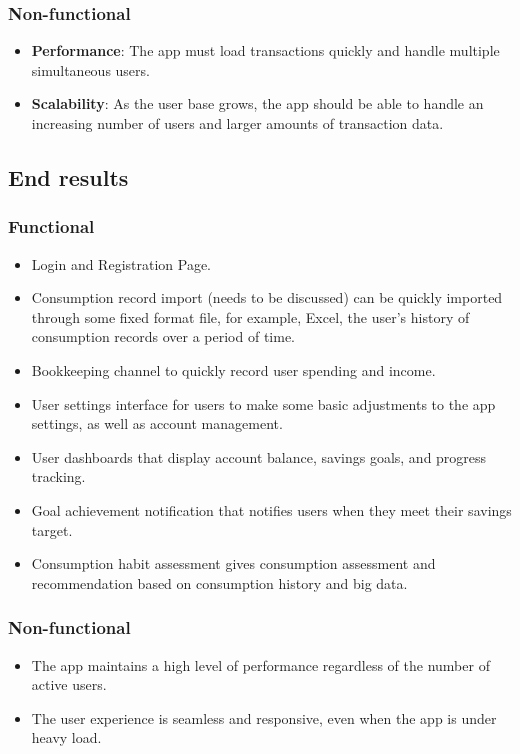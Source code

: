 \documentclass{article}
\begin{document}
\subsubsection{Non-functional}
\begin{itemize}
    \item \textbf{Performance}: The app must load transactions quickly and handle multiple simultaneous users.
    \item \textbf{Scalability}: As the user base grows, the app should be able to handle an increasing number of users and larger amounts of transaction data.
\end{itemize}
\subsection{End results}
\subsubsection{Functional}
\begin{itemize}
    \item Login and Registration Page.
    \item Consumption record import (needs to be discussed) can be quickly imported through some fixed format file, for example, Excel, the user’s history of consumption records over a period of time.
    \item Bookkeeping channel to quickly record user spending and income.
    \item User settings interface for users to make some basic adjustments to the app settings, as well as account management.
    \item User dashboards that display account balance, savings goals, and progress tracking.
    \item Goal achievement notification that notifies users when they meet their savings target.
    \item Consumption habit assessment gives consumption assessment and recommendation based on consumption history and big data.
\end{itemize}
\subsubsection{Non-functional}
\begin{itemize}
    \item The app maintains a high level of performance regardless of the number of active users.
    \item The user experience is seamless and responsive, even when the app is under heavy load.
\end{itemize}
\end{document}
